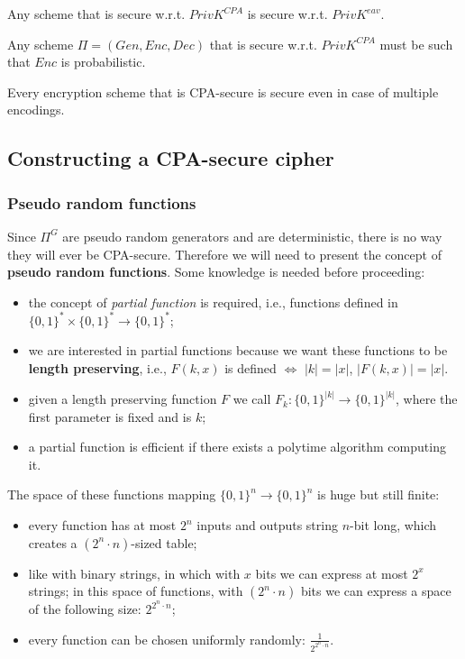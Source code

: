 \documentclass[../main]{subfiles}
\begin{document}
\begin{lemma}
    Any scheme that is secure w.r.t. $PrivK^{CPA}$ is secure w.r.t. $PrivK^{eav}.$
\end{lemma}

\begin{lemma}
    Any scheme $\Pi{}=(Gen, Enc, Dec)$ that is secure w.r.t. $PrivK^{CPA}$ must be such that $Enc$ is probabilistic.
\end{lemma}

\begin{theorem}
    Every encryption scheme that is CPA-secure is secure even in case of multiple encodings.
\end{theorem}

\subsection{Constructing a CPA-secure cipher}

\subsubsection{Pseudo random functions}
Since $\Pi^G$ are pseudo random generators and are deterministic, there is no way they will ever be CPA-secure.
Therefore we will need to present the concept of \textbf{pseudo random functions}.
Some knowledge is needed before proceeding:
\begin{itemize}
    \item the concept of \textit{partial function} is required, i.e., functions defined in $\{0,1\}^*\times\{0,1\}^*\rightarrow\{0,1\}^*$;
    \item we are interested in partial functions because we want these functions to be \textbf{length preserving}, i.e., $F(k,x)$ is defined $\Leftrightarrow$ $|k| = |x|$, $|F(k,x)| = |x|$.
    \item given a length preserving function $F$ we call $F_k: \{0,1\}^{|k|} \rightarrow{} \{0,1\}^{|k|}$, where the first parameter is fixed and is $k$;
    \item a partial function is efficient if there exists a polytime algorithm computing it.
\end{itemize}
The space of these functions mapping $\{0,1\}^n \rightarrow{} \{0,1\}^n$ is huge but still finite:
\begin{itemize}
    \item every function has at most $2^n$ inputs and outputs string $n$-bit long, which creates a $(2^n \cdot{} n)$-sized table;
    \item like with binary strings, in which with $x$ bits we can express at most $2^x$ strings; in this space of functions, with $(2^n \cdot{} n)$ bits we can express a space of the following size: $2^{2^n \cdot{} n}$;
    \item every function can be chosen uniformly randomly: $\frac{1}{2^{2^n \cdot{} n}}$.
\end{itemize}
\end{document}
